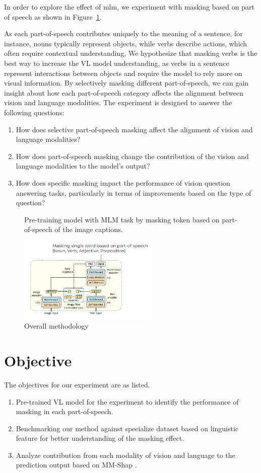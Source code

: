 In order to explore the effect of \acrshort{mlm}, we experiment with masking based on part of speech as shown in Figure~\ref{fig:overview}.

As each part-of-speech contributes uniquely to the meaning of a sentence, for instance, nouns typically represent objects, while verbs describe actions, which often require contextual understanding, 
We hypothesize that masking verbs is the best way to increase the VL model understanding, as verbs in a sentence represent interactions between objects and require the model to rely more on visual information.
By selectively masking different part-of-speech, we can gain insight about how each part-of-speech category affects the alignment between vision and language modalities. 
The experiment is designed to answer the following questions:
\begin{enumerate}
    \item How does selective part-of-speech masking affect the alignment of vision and language modalities?
    \item How does part-of-speech masking change the contribution of the vision and language modalities to the model's output?
    \item How does specific masking impact the performance of vision question answering tasks, particularly in terms of improvements based on the type of question?
\end{enumerate}

\begin{figure}[h]
    \caption{Overall methodology}
    \label{fig:overview}
    Pre-training model with MLM task by masking token based on part-of-speech of the image captions.
    \begin{center}
        \includegraphics[width=0.6\textwidth]{Images/overview.png}
    \end{center}
    \small
\end{figure}

\section{Objective}
The objectives for our experiment are as listed.
\begin{enumerate}
    \item Pre-trained VL model for the experiment to identify the performance of masking in each part-of-speech.
    \item Benchmarking our method against specialize dataset based on linguistic feature \cite{valse} for better understanding of the masking effect.
    \item Analyze contribution from each modality of vision and language to the prediction output based on MM-Shap \cite{mm-shap}.
\end{enumerate}

